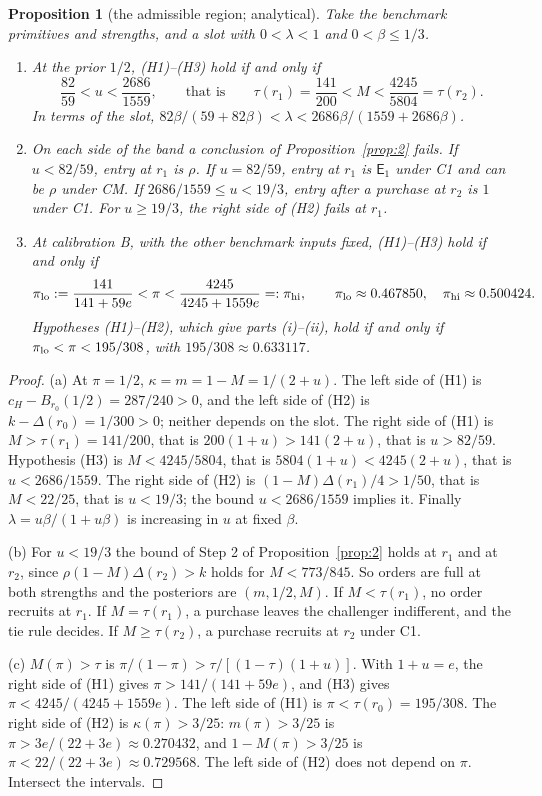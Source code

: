 \documentclass[11pt]{article}
\newtheorem{proposition}{Proposition}
\theoremstyle{definition}
\newcommand{\Ent}{\mathsf E}
\begin{document}
\setcounter{proposition}{3}
\begin{proposition}[the admissible region; analytical]\label{prop:region}
Take the benchmark primitives and strengths, and a slot with $0<\lambda<1$ and $0<\beta\le1/3$.
\begin{enumerate}[label=(\alph*)]
\item At the prior $1/2$, (H1)--(H3) hold if and only if
  \[
  \frac{82}{59}<u<\frac{2686}{1559},\qquad\text{that is}\qquad \tau(r_1)=\frac{141}{200}<M<\frac{4245}{5804}=\tau(r_2).
  \]
  In terms of the slot, $82\beta/(59+82\beta)<\lambda<2686\beta/(1559+2686\beta)$.
\item On each side of the band a conclusion of Proposition~\ref{prop:2} fails. If $u<82/59$, entry at $r_1$ is
  $\rho$. If $u=82/59$, entry at $r_1$ is $\Ent_1$ under C1 and can be $\rho$ under CM. If $2686/1559\le u<19/3$,
  entry after a purchase at $r_2$ is $1$ under C1. For $u\ge19/3$, the right side of (H2) fails at $r_1$.
\item At calibration B, with the other benchmark inputs fixed, (H1)--(H3) hold if and only if
  \[
  \pi_{\rm lo}:=\frac{141}{141+59e}<\pi<\frac{4245}{4245+1559e}=:\pi_{\rm hi},\qquad
  \pi_{\rm lo}\approx0.467850,\quad \pi_{\rm hi}\approx0.500424.
  \]
  Hypotheses (H1)--(H2), which give parts (i)--(ii), hold if and only if $\pi_{\rm lo}<\pi<195/308$, with
  $195/308\approx0.633117$.
\end{enumerate}
\end{proposition}

\begin{proof}
(a) At $\pi=1/2$, $\kappa=m=1-M=1/(2+u)$. The left side of (H1) is $c_H-B_{r_0}(1/2)=287/240>0$, and the left
side of (H2) is $k-\Delta(r_0)=1/300>0$; neither depends on the slot. The right side of (H1) is
$M>\tau(r_1)=141/200$, that is $200(1+u)>141(2+u)$, that is $u>82/59$. Hypothesis (H3) is $M<4245/5804$, that is
$5804(1+u)<4245(2+u)$, that is $u<2686/1559$. The right side of (H2) is $(1-M)\Delta(r_1)/4>1/50$, that is
$M<22/25$, that is $u<19/3$; the bound $u<2686/1559$ implies it. Finally $\lambda=u\beta/(1+u\beta)$ is increasing
in $u$ at fixed $\beta$.

(b) For $u<19/3$ the bound of Step 2 of Proposition~\ref{prop:2} holds at $r_1$ and at $r_2$, since
$\rho(1-M)\Delta(r_2)>k$ holds for $M<773/845$. So orders are full at both strengths and the posteriors are
$(m,1/2,M)$. If $M<\tau(r_1)$, no order recruits at $r_1$. If $M=\tau(r_1)$, a purchase leaves the challenger
indifferent, and the tie rule decides. If $M\ge\tau(r_2)$, a purchase recruits at $r_2$ under C1.

(c) $M(\pi)>\tau$ is $\pi/(1-\pi)>\tau/[(1-\tau)(1+u)]$. With $1+u=e$, the right side of (H1) gives
$\pi>141/(141+59e)$, and (H3) gives $\pi<4245/(4245+1559e)$. The left side of (H1) is $\pi<\tau(r_0)=195/308$. The
right side of (H2) is $\kappa(\pi)>3/25$: $m(\pi)>3/25$ is $\pi>3e/(22+3e)\approx0.270432$, and $1-M(\pi)>3/25$ is
$\pi<22/(22+3e)\approx0.729568$. The left side of (H2) does not depend on $\pi$. Intersect the intervals.
\end{proof}
\end{document}
